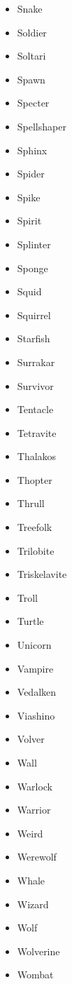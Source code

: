 \documentclass{article}
\begin{document}
\begin{multicols}{3}
\begin{itemize}
        \item Snake
        \item Soldier
        \item Soltari
        \item Spawn
        \item Specter
        \item Spellshaper
        \item Sphinx
        \item Spider
        \item Spike
        \item Spirit
        \item Splinter
        \item Sponge
        \item Squid
        \item Squirrel
        \item Starfish
        \item Surrakar
        \item Survivor
        \item Tentacle
        \item Tetravite
        \item Thalakos
        \item Thopter
        \item Thrull
        \item Treefolk
        \item Trilobite
        \item Triskelavite
        \item Troll
        \item Turtle
        \item Unicorn
        \item Vampire
        \item Vedalken
        \item Viashino
        \item Volver
        \item Wall
        \item Warlock
        \item Warrior
        \item Weird
        \item Werewolf
        \item Whale
        \item Wizard
        \item Wolf
        \item Wolverine
        \item Wombat

\end{itemize}
\end{multicols}
\end{document}
